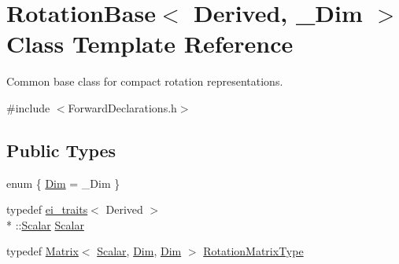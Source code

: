 \hypertarget{class_rotation_base}{\section{Rotation\-Base$<$ Derived, \-\_\-\-Dim $>$ Class Template Reference}
\label{class_rotation_base}
}


Common base class for compact rotation representations.  




{\ttfamily \#include $<$Forward\-Declarations.\-h$>$}

\subsection*{Public Types}
\begin{DoxyCompactItemize}
\item 
enum \{ \hyperlink{class_rotation_base_aef5b1b1e75f2a8791e700e70c36b6bc6a461876d0cdf2fd5c72b83070d017c212}{Dim} = \-\_\-\-Dim
 \}
\item 
typedef \hyperlink{structei__traits}{ei\-\_\-traits}$<$ Derived $>$\\*
\-::\hyperlink{class_rotation_base_ae9cbe0a3a87dfe2fa70958d9fe948a09}{Scalar} \hyperlink{class_rotation_base_ae9cbe0a3a87dfe2fa70958d9fe948a09}{Scalar}
\item 
typedef \hyperlink{class_matrix}{Matrix}$<$ \hyperlink{class_rotation_base_ae9cbe0a3a87dfe2fa70958d9fe948a09}{Scalar}, \hyperlink{class_rotation_base_aef5b1b1e75f2a8791e700e70c36b6bc6a461876d0cdf2fd5c72b83070d017c212}{Dim}, \hyperlink{class_rotation_base_aef5b1b1e75f2a8791e700e70c36b6bc6a461876d0cdf2fd5c72b83070d017c212}{Dim} $>$ \hyperlink{class_rotation_base_a0f1d2a93b35fbb954e587ab655d68d31}{Rotation\-Matrix\-Type}
\end{DoxyCompactItemize}

